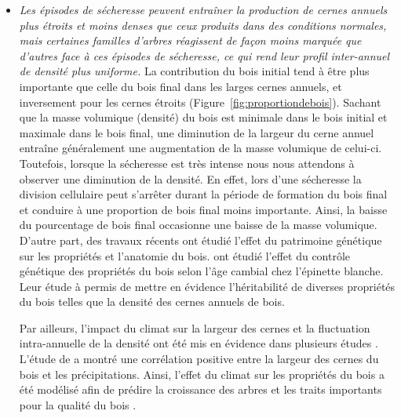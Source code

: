 \documentclass{report}
\begin{document}
\begin{itemize}	
	

	\item  \emph{Les épisodes de sécheresse peuvent entraîner la production de cernes annuels plus étroits et moins denses que ceux produits dans des conditions normales, mais certaines familles d'arbres réagissent de façon moins marquée que d'autres face à ces épisodes de sécheresse, ce qui rend leur profil inter-annuel de densité plus uniforme.} La contribution du bois initial tend à être plus importante que celle du bois final dans les larges cernes annuels, et inversement pour les cernes étroits \citep{Moore2011} (Figure~\ref{fig:proportiondebois}). Sachant que la masse volumique (densité) du bois est minimale dans le bois initial et maximale dans le bois final, une diminution de la largeur du cerne annuel entraîne généralement une augmentation de la masse volumique de celui-ci. Toutefois, lorsque la sécheresse est très intense nous nous attendons à observer une diminution de la densité. En effet, lors d'une sécheresse la division cellulaire peut s'arrêter durant la période de formation du bois final et conduire à une proportion de bois final moins importante. Ainsi, la baisse du pourcentage de bois final occasionne une baisse de la masse volumique. \\ %
	
	D'autre part, des travaux récents ont étudié l'effet du patrimoine génétique sur les propriétés et l'anatomie du bois. \cite{Lenz2010} ont étudié l'effet du contrôle génétique des propriétés du bois selon l'âge cambial chez l'épinette blanche. Leur étude à permis de mettre en évidence l'héritabilité de diverses propriétés du bois telles que la densité des cernes annuels de bois. %
	
	Par ailleurs, l'impact du climat sur la largeur des cernes et la fluctuation intra-annuelle de la densité ont été mis en évidence dans plusieurs études \citep{Campeloa2007, Campelo2013,Drew2012}. L'étude de \cite{Xu2012} a montré une corrélation positive entre la largeur des cernes du bois et les précipitations. Ainsi, l'effet du climat sur les propriétés du bois a été modélisé afin de prédire la croissance des arbres et les traits importants pour la qualité du bois \citep{ Bouriaud2004, GARDINER2011, Wilkinson2015,Auty2016}.\\ 
	

\end{itemize}
\end{document}
